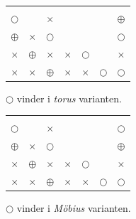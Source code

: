 \mbox{}\vfill
\begin{minipage}{0.45\textwidth}
\centering
\begin{tabular}{|c|c|c|c|c|c|c|}
    \hline
    & & & & & & \\ 
    \hline
    & & & & & & \\
    \hline
    {\scriptsize$\bigcirc$} & & $\times$ & & & & $\oplus$ \\
    \hline
    $\oplus$ & $\times$ & {\scriptsize$\bigcirc$} & & & & {\scriptsize$\bigcirc$} \\
    \hline
    $\times$ & $\oplus$ & $\times$ & $\times$ & {\scriptsize$\bigcirc$} & & $\times$ \\
    \hline
    $\times$ & $\times$ & $\oplus$ & $\times$ & $\times $& {\scriptsize$\bigcirc$} & {\scriptsize$\bigcirc$} \\
    \hline
\end{tabular}

{\scriptsize$\bigcirc$} vinder i \textit{torus} varianten.
\end{minipage}
\begin{minipage}{0.45\textwidth}
\centering
\begin{tabular}{|c|c|c|c|c|c|c|}
    \hline
    & & & & & & \\ 
    \hline
    & & & & & & \\
    \hline
    {\scriptsize$\bigcirc$} & & $\times$ & & & & {\scriptsize$\bigcirc$} \\
    \hline
    $\oplus$ & $\times$ & {\scriptsize$\bigcirc$} & & & & $\oplus$ \\
    \hline
    $\times$ & $\oplus$ & $\times$ & $\times$ & {\scriptsize$\bigcirc$} & & $\times$ \\
    \hline
    $\times$ & $\times$ & $\oplus$ & $\times$ & $\times $& {\scriptsize$\bigcirc$} & {\scriptsize$\bigcirc$} \\
    \hline
\end{tabular}

{\scriptsize$\bigcirc$} vinder i \textit{Möbius} varianten.
\end{minipage}
\newline\newline


